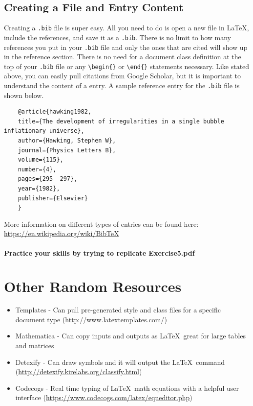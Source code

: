 \documentclass[]{article}%
\newcommand{\bs}{\textbackslash}
\newcommand{\TT}[1]{\texttt{#1}}
\newcommand{\tpc}{\textperiodcentered}
\theoremstyle{definition}
\begin{document}
	\subsection{Creating a  File and Entry Content}
	Creating a \TT{.bib} file is super easy.
	All you need to do is open a new file in \LaTeX, include the references, and save it as a \TT{.bib}.
	There is no limit to how many references you put in your \TT{.bib} file and only the ones that are cited will show up in the reference section.
	There is no need for a document class definition at the top of your \TT{.bib} file or any \TT{\bs begin\{\tpc\}} or \TT{\bs end\{\tpc\}} statements necessary.
	Like stated above, you can easily pull  citations from Google Scholar, but it is important to understand the content of a  entry.
	A sample reference entry for the \TT{.bib} file is shown below.
	\begin{verbatim}
	@article{hawking1982,
	title={The development of irregularities in a single bubble inflationary universe},
	author={Hawking, Stephen W},
	journal={Physics Letters B},
	volume={115},
	number={4},
	pages={295--297},
	year={1982},
	publisher={Elsevier}
	}
	\end{verbatim}
	More information on different types of entries can be found here: \url{https://en.wikipedia.org/wiki/BibTeX}
	
	\paragraph{Practice your  skills by trying to replicate Exercise5.pdf}
	
	\clearpage
	\section{Other Random Resources}
	\begin{itemize}
		\item Templates - Can pull pre-generated style and class files for a specific document type (\url{http://www.latextemplates.com/})
		\item Mathematica - Can copy inputs and outputs as \LaTeX\, great for large tables and matrices
		\item Detexify - Can draw symbols and it will output the \LaTeX\ command (\url{http://detexify.kirelabs.org/classify.html})
		\item Codecogs  - Real time typing of \LaTeX\ math equations with a helpful user interface (\url{https://www.codecogs.com/latex/eqneditor.php})
	\end{itemize}
	
	\clearpage
	
	
\end{document}
